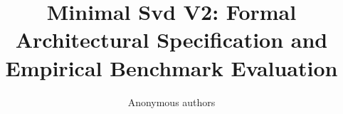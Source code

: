 \title{\textbf{Minimal Svd V2: Formal Architectural Specification and Empirical Benchmark Evaluation}}

\author{Anonymous authors}
